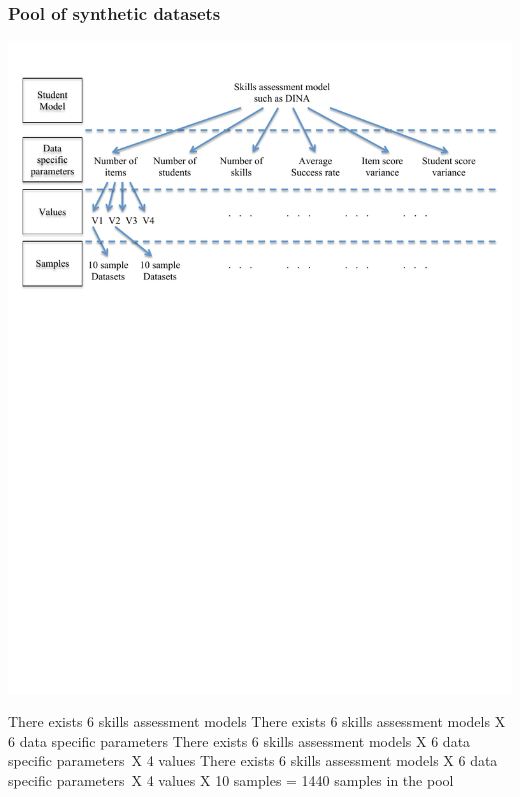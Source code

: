 \documentclass{beamer}
\begin{document}
\begin{frame}\frametitle{Pool of synthetic datasets}
\includegraphics[trim=1cm 17cm 1cm 1cm,scale=0.55]{images/Data-Gen-Break-Down.pdf}
\begin{overprint}
 There exists 6 skills assessment models 
 There exists 6 skills assessment models X 6 data specific parameters 
 There exists 6 skills assessment models X 6 data specific parameters~X 4 values 
 There exists 6 skills assessment models X 6 data specific parameters~X 4 values X 10 samples = 1440 samples in the pool
\end{overprint}
\end{frame}
\end{document}
